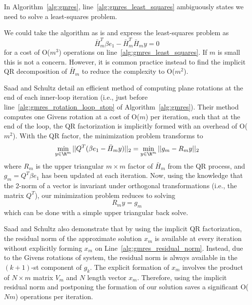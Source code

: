 In Algorithm~\ref{alg:gmres}, line~\ref{alg:gmres_least_squares} ambiguously states we need to solve a least-squares problem. 


We could take the algorithm as is and express the least-squares problem as 
\begin{equation} 
\bar{H}_m^T \beta e_1 - \bar{H}_m^T \bar{H}_m y = 0 \label{eq:least_squares}
\end{equation}
for a cost of O($m^3$) operations on line~\ref{alg:gmres_least_squares}. If $m$ is small this is not a concern. However, it is common practice instead to find the implicit QR decomposition of $\bar{H}_m$ to reduce the complexity to O($m^2$). 

Saad and Schultz \cite{Saad1986} detail an efficient method of computing plane rotations at the end of each inner-loop iteration (i.e., just before line~\ref{alg:gmres_rotation_loop_stop} of Algorithm~\ref{alg:gmres}). Their method computes one Givens rotation at a cost of O($m$) per iteration, such that at the end of the loop, the QR factorization is implicitly formed with an overhead of O($m^2$). With the QR factor, the minimization problem transforms to 
$$\min_{y \in \R^m} ||Q^T (\beta e_1 - \bar{H}_m y) ||_2 = \min_{y \in \R^m} ||g_m - R_m y||_2$$
where $R_m$ is the upper triangular $m\times m$ factor of $\bar{H}_m$ from the QR process, and $g_m = Q^T \beta e_1$ has been updated at each iteration. Now, using the knowledge that the 2-norm of a vector is invariant under orthogonal transformations (i.e., the matrix $Q^T$), our minimization problem reduces to solving $$ R_m y = g_m $$ which can be done with a simple upper triangular back solve. 

Saad and Schultz \cite{Saad1986} also demonstrate that by using the implicit QR factorization, the residual norm of the approximate solution $x_m$ is available at every iteration without explicitly forming $x_m$ on Line~\ref{alg:gmres_residual_norm}. Instead, due to the Givens rotations of system, the residual norm is always available in the $(k+1)$-st component of $g_k$. The explicit formation of $x_m$ involves the product of $N \times m$ matrix $V_m$ and $N$ length vector $x_m$. Therefore, using the implicit residual norm and postponing the formation of our solution saves a significant O($Nm$) operations per iteration. 

